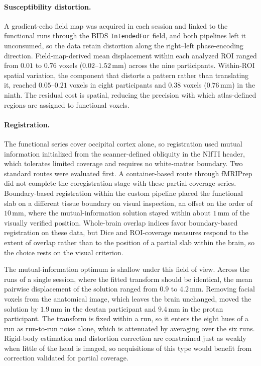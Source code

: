 \paragraph{Susceptibility distortion.}
A gradient-echo field map was acquired in each session and linked to the functional runs through the BIDS \texttt{IntendedFor} field, and both pipelines left it unconsumed, so the data retain distortion along the right--left phase-encoding direction. Field-map-derived mean displacement within each analyzed ROI ranged from $0.01$ to $0.76$ voxels ($0.02$--$1.52$\,mm) across the nine participants. Within-ROI spatial variation, the component that distorts a pattern rather than translating it, reached $0.05$--$0.21$ voxels in eight participants and $0.38$ voxels ($0.76$\,mm) in the ninth. The residual cost is spatial, reducing the precision with which atlas-defined regions are assigned to functional voxels.

\paragraph{Registration.}
The functional series cover occipital cortex alone, so registration used mutual information initialized from the scanner-defined obliquity in the NIfTI header, which tolerates limited coverage and requires no white-matter boundary. Two standard routes were evaluated first. A container-based route through fMRIPrep did not complete the coregistration stage with these partial-coverage series. Boundary-based registration within the custom pipeline placed the functional slab on a different tissue boundary on visual inspection, an offset on the order of $10$\,mm, where the mutual-information solution stayed within about $1$\,mm of the visually verified position. Whole-brain overlap indices favor boundary-based registration on these data, but Dice and ROI-coverage measures respond to the extent of overlap rather than to the position of a partial slab within the brain, so the choice rests on the visual criterion.

The mutual-information optimum is shallow under this field of view. Across the runs of a single session, where the fitted transform should be identical, the mean pairwise displacement of the solution ranged from $0.9$ to $4.2$\,mm. Removing facial voxels from the anatomical image, which leaves the brain unchanged, moved the solution by $1.9$\,mm in the deutan participant and $9.4$\,mm in the protan participant. The transform is fixed within a run, so it enters the eight hues of a run as run-to-run noise alone, which is attenuated by averaging over the six runs. Rigid-body estimation and distortion correction are constrained just as weakly when little of the head is imaged, so acquisitions of this type would benefit from correction validated for partial coverage.


